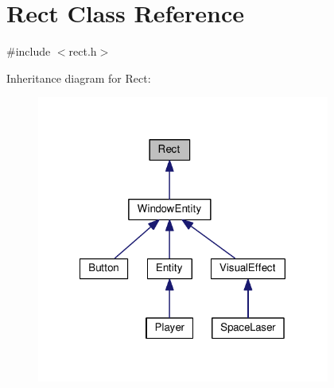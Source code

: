 \hypertarget{class_rect}{\section{Rect Class Reference}
\label{class_rect}
}


{\ttfamily \#include $<$rect.\-h$>$}



Inheritance diagram for Rect\-:\nopagebreak
\begin{figure}[H]
\begin{center}
\leavevmode
\includegraphics[width=273pt]{class_rect__inherit__graph}
\end{center}
\end{figure}
